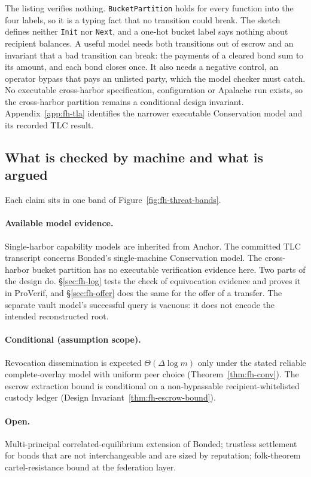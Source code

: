 \documentclass[11pt,a4paper]{article}
\theoremstyle{definition}
\theoremstyle{remark}
\begin{document}
The listing verifies nothing. \texttt{BucketPartition} holds for every function into the four labels, so it is a typing fact that no transition could break. The sketch defines neither \texttt{Init} nor \texttt{Next}, and a one-hot bucket label says nothing about recipient balances. A useful model needs both transitions out of escrow and an invariant that a bad transition can break: the payments of a cleared bond sum to its amount, and each bond closes once. It also needs a negative control, an operator bypass that pays an unlisted party, which the model checker must catch. No executable cross-harbor specification, configuration or Apalache run exists, so the cross-harbor partition remains a conditional design invariant. Appendix~\ref{app:fh-tla} identifies the narrower executable Conservation model and its recorded TLC result.

\subsection{What is checked by machine and what is argued}\label{sec:fh-mech-summary}

Each claim sits in one band of Figure~\ref{fig:fh-threat-bands}.

\paragraph{Available model evidence.} Single-harbor capability models are inherited from Anchor. The committed TLC transcript concerns Bonded's single-machine Conservation model. The cross-harbor bucket partition has no executable verification evidence here. Two parts of the design do. \S\ref{sec:fh-log} tests the check of equivocation evidence and proves it in ProVerif, and \S\ref{sec:fh-offer} does the same for the offer of a transfer. The separate vault model's successful query is vacuous: it does not encode the intended reconstructed root.

\paragraph{Conditional (assumption scope).} Revocation dissemination is expected $\Theta(\Delta\log m)$ only under the stated reliable complete-overlay model with uniform peer choice (Theorem~\ref{thm:fh-conv}). The escrow extraction bound is conditional on a non-bypassable recipient-whitelisted custody ledger (Design Invariant~\ref{thm:fh-escrow-bound}).

\paragraph{Open.} Multi-principal correlated-equilibrium extension of Bonded; trustless settlement for bonds that are not interchangeable and are sized by reputation; folk-theorem cartel-resistance bound at the federation layer.
\end{document}
